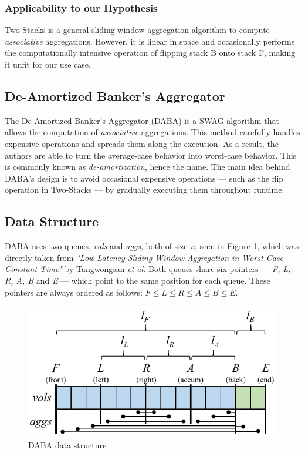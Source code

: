 \subsubsection*{Applicability to our Hypothesis}
Two-Stacks is a general sliding window aggregation algorithm to compute \textit{associative} aggregations. However, it is linear in space and occasionally performs the computationally intensive operation of flipping stack B onto stack F, making it unfit for our use case.


\subsection{De-Amortized Banker’s Aggregator} \label{sec:daba}

The De-Amortized Banker’s Aggregator (DABA) \cite{Tangwongsan-DABA} is a SWAG algorithm that allows the computation of \textit{associative} aggregations. This method carefully handles expensive operations and spreads them along the execution. As a result, the authors are able to turn the average-case behavior into worst-case behavior. This is commonly known as \textit{de-amortization}, hence the name. The main idea behind DABA's design is to avoid occasional expensive operations --- such as the flip operation in Two-Stacks --- by gradually executing them throughout runtime.

\subsection*{Data Structure}

DABA uses two queues, \textit{vals} and \textit{aggs}, both of size \textit{n}, seen in Figure \ref{fig:daba-ds}, which was directly taken from \textit{"Low-Latency Sliding-Window Aggregation in Worst-Case Constant Time"} by Tangwongsan \emph{et al.} Both queues share six pointers --- \textit{F, L, R, A, B} and \textit{E} --- which point to the same position for each queue. These pointers are always ordered as follows: $F \leq L \leq R \leq A \leq B \leq E$.

\begin{figure}[!htb]
    \begin{center}
      \includegraphics[scale=0.6]{figures/daba-ds.png}
      \caption[DABA data structure]{DABA data structure \cite{Tangwongsan-DABA}}
      \label{fig:daba-ds}
    \end{center}
\end{figure}

